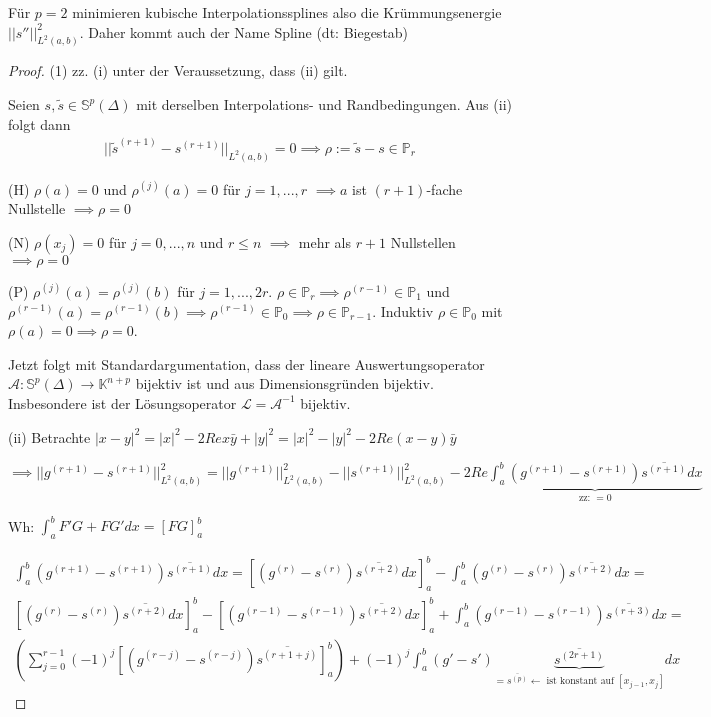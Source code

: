 \begin{remark}
	Für $p=2$ minimieren kubische Interpolationssplines also die Krümmungsenergie $||s''||_{L^2(a,b)}^2$. Daher kommt auch der Name Spline (dt: Biegestab)
\end{remark}

\begin{proof}
	(1) zz. (i) unter der Veraussetzung, dass (ii) gilt.
	
	Seien $s, \tilde{s} \in \mathbb{S}^p(\Delta)$ mit derselben Interpolations- und Randbedingungen. Aus (ii) folgt dann
	\begin{align*}
		||\tilde{s}^{(r+1)} - s^{(r+1)}||_{L^2(a,b)} = 0 \implies \rho := \tilde{s} - s \in \mathbb{P}_r
	\end{align*}
	
	(H) $\rho(a) = 0$ und $\rho^{(j)}(a) = 0$ für $j=1, ..., r$ $\implies a$ ist $(r+1)$-fache Nullstelle $\implies \rho = 0$
	
	(N) $\rho(x_j) = 0$ für $j=0, ..., n$ und $r \leq n$ $\implies$ mehr als $r+1$ Nullstellen $\implies \rho = 0$
	
	(P) $\rho^{(j)}(a) = \rho^{(j)}(b)$ für $j = 1, ..., 2r$. $\rho \in \mathbb{P}_r \implies \rho^{(r-1)} \in \mathbb{P}_1$ und $\rho^{(r-1)}(a) = \rho^{(r-1)}(b) \implies \rho^{(r-1)} \in \mathbb{P}_0 \implies \rho \in \mathbb{P}_{r-1}$. Induktiv $\rho \in \mathbb{P}_0$ mit $\rho(a) = 0 \implies \rho = 0$.
	
	Jetzt folgt mit Standardargumentation, dass der lineare Auswertungsoperator $\mathcal{A}: \mathbb{S}^p(\Delta) \rightarrow \mathbb{K}^{n+p}$ bijektiv ist und aus Dimensionsgründen bijektiv. Insbesondere ist der Lösungsoperator $\mathcal{L} = \mathcal{A}^{-1}$ bijektiv.
	
	(ii) Betrachte $|x-y|^2 = |x|^2 - 2 Re x \bar{y} + |y|^2 = |x|^2 - |y|^2 - 2 Re (x-y)\bar{y}$
	
	$\implies ||g^{(r+1)} - s^{(r+1)}||_{L^2(a,b)}^2 = ||g^{(r+1)}||_{L^2(a,b)}^2 - ||s^{(r+1)}||_{L^2(a,b)}^2 - 2 Re \underbrace{\int_{a}^{b} (g^{(r+1)} - s^{(r+1)}) \overline{s^{(r+1)}} dx}_{\text{zz: }=0}$
	
	Wh: $\int_{a}^{b}F'G + FG' dx = [FG]_a^b$
	
	\begin{align*}
		\int_{a}^{b} (g^{(r+1)} - s^{(r+1)}) \overline{s^{(r+1)}} dx = \left[(g^{(r)} - s^{(r)}) \overline{s^{(r+2)}} dx \right]_a^b - \int_{a}^{b} (g^{(r)} - s^{(r)}) \overline{s^{(r+2)}} dx =\\
		\left[(g^{(r)} - s^{(r)}) \overline{s^{(r+2)}} dx \right]_a^b - \left[(g^{(r-1)} - s^{(r-1)}) \overline{s^{(r+2)}} dx \right]_a^b + \int_{a}^{b} (g^{(r-1)} - s^{(r-1)}) \overline{s^{(r+3)}} dx =\\
		\left(\sum_{j=0}^{r-1} (-1)^j \left[(g^{(r-j)} - s^{(r-j)}) \overline{s^{(r+1+j)}}\right]_a^b \right) + (-1)^j \int_{a}^{b} (g' - s') \underbrace{\overline{s^{(2r+1)}}}_{=\overline{s^{(p)}} \leftarrow \text{ ist konstant auf }[x_{j-1}, x_j]} dx
	\end{align*}
	

\end{proof}
